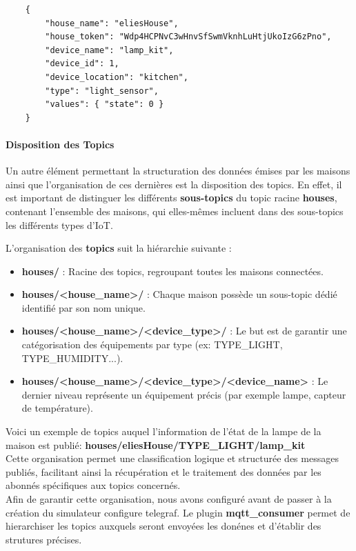 \documentclass[10pt, a4paper]{report}
\begin{document}
	\begin{lstlisting}
	{
		"house_name": "eliesHouse",
		"house_token": "Wdp4HCPNvC3wHnvSfSwmVknhLuHtjUkoIzG6zPno",
		"device_name": "lamp_kit",
		"device_id": 1,
		"device_location": "kitchen",
		"type": "light_sensor",
		"values": { "state": 0 }
	}
	\end{lstlisting}
	
	\paragraph{Disposition des Topics}
	
Un autre élément permettant la structuration des données émises par les maisons ainsi que l'organisation de ces dernières est la disposition des topics.
En effet, il est important de distinguer les différents \textbf{sous-topics} du topic racine \textbf{houses}, contenant l'ensemble des maisons, qui elles-mêmes incluent dans des sous-topics les différents types d'IoT.

L'organisation des \textbf{topics} suit la hiérarchie suivante :
\begin{itemize}
	\item \textbf{houses/} : Racine des topics, regroupant toutes les maisons connectées.
	\item \textbf{houses/<house\_name>/} : Chaque maison possède un sous-topic dédié identifié par son nom unique.
	\item \textbf{houses/<house\_name>/<device\_type>/} : Le but est de garantir une catégorisation des équipements par type (ex: TYPE\_LIGHT, TYPE\_HUMIDITY...).
	\item \textbf{houses/<house\_name>/<device\_type>/<device\_name>} : Le dernier niveau représente un équipement précis (par exemple lampe, capteur de température).
\end{itemize}
	\vspace{1cm}
	Voici un exemple de topics auquel l'information de l'état de la lampe de la maison est publié:
	\textbf{houses/eliesHouse/TYPE\_LIGHT/lamp\_kit}\\
	

	Cette organisation permet une classification logique et structurée des messages publiés, facilitant ainsi la récupération et le traitement des données par les abonnés spécifiques aux topics concernés.\\
	
	Afin de garantir cette organisation, nous avons configuré avant de passer à la création du simulateur configure telegraf. Le plugin \textbf{mqtt\_consumer} permet de hierarchiser les topics auxquels seront envoyées les donénes et d'établir des strutures précises.
\end{document}

